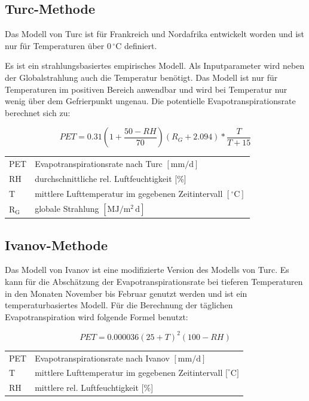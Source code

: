 \subsection{Turc-Methode}
Das Modell von Turc ist für Frankreich und Nordafrika entwickelt worden und ist nur für Temperaturen über 0\,$\mathrm{^{\circ}C}$ definiert.

Es ist ein strahlungsbasiertes empirisches Modell. Als Inputparameter wird neben der Globalstrahlung auch die Temperatur benötigt. Das Modell ist nur für Temperaturen im positiven Bereich anwendbar und wird bei Temperatur nur wenig über dem Gefrierpunkt ungenau. Die potentielle Evapotranspirationsrate berechnet sich zu:

\begin{equation}
\label{eq:turc}
PET=0.31\left(1+\frac{50-RH}{70}\right)\left(R_G+2.094\right)*\frac{T}{T+15}
\end{equation}
\begin{table}[H]
\centering
\begin{tabular}{ll}
PET & Evapotranspirationsrate nach Turc  $\mathrm{[mm/d]}$\\
RH& durchschnittliche rel. Luftfeuchtigkeit [\%]\\
T & mittlere Lufttemperatur im gegebenen Zeitintervall $\mathrm{[^{\circ}C]}$\\
$\mathrm{R_G}$ & globale Strahlung $\mathrm{[MJ/m^2\,d]}$\\
\end{tabular}
\end{table}


\subsection{Ivanov-Methode}
Das Modell von Ivanov ist eine modifizierte Version des Modells von Turc. Es kann für die Abschätzung der Evapotranspirationsrate bei tieferen Temperaturen in den Monaten November bis Februar genutzt werden und ist ein temperaturbasiertes Modell. Für die Berechnung der täglichen Evapotranspiration wird folgende Formel benutzt:

\begin{equation}
\label{eq:ivanov_d}
PET=0.000036(25+T)^2(100-RH)
\end{equation}
\begin{table}[H]
\centering
\begin{tabular}{ll}
PET & Evapotranspirationsrate nach Ivanov  $\mathrm{[mm/d]}$\\
T & mittlere Lufttemperatur im gegebenen Zeitintervall $\mathrm{{[^\circ}C]}$\\
RH& mittlere rel. Luftfeuchtigkeit [\%]\\
\end{tabular}
\end{table}

